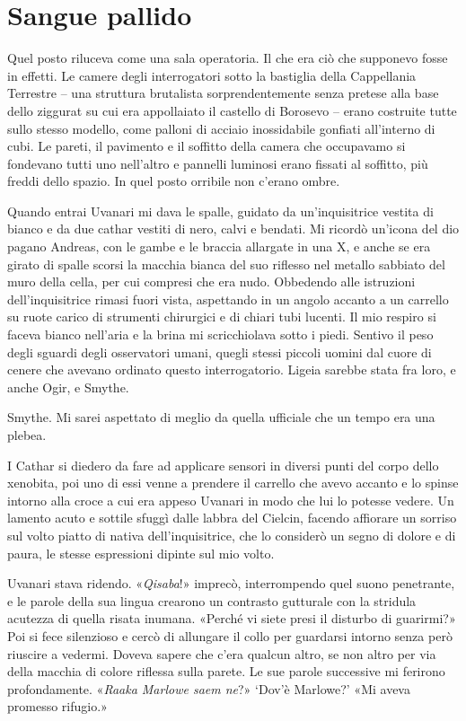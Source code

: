 \chapter{Sangue pallido}

Quel posto riluceva come una sala operatoria. Il che era ciò che
supponevo fosse in effetti. Le camere degli interrogatori sotto la
bastiglia della Cappellania Terrestre -- una struttura brutalista
sorprendentemente senza pretese alla base dello ziggurat su cui era
appollaiato il castello di Borosevo -- erano costruite tutte sullo
stesso modello, come palloni di acciaio inossidabile gonfiati
all'interno di cubi. Le pareti, il pavimento e il soffitto della camera
che occupavamo si fondevano tutti uno nell'altro e pannelli luminosi
erano fissati al soffitto, più freddi dello spazio. In quel posto
orribile non c'erano ombre.

Quando entrai Uvanari mi dava le spalle, guidato da un'inquisitrice
vestita di bianco e da due cathar vestiti di nero, calvi e bendati. Mi
ricordò un'icona del dio pagano Andreas, con le gambe e le braccia
allargate in una X, e anche se era girato di spalle scorsi la macchia
bianca del suo riflesso nel metallo sabbiato del muro della cella, per
cui compresi che era nudo. Obbedendo alle istruzioni dell'inquisitrice
rimasi fuori vista, aspettando in un angolo accanto a un carrello su
ruote carico di strumenti chirurgici e di chiari tubi lucenti. Il mio
respiro si faceva bianco nell'aria e la brina mi scricchiolava sotto i
piedi. Sentivo il peso degli sguardi degli osservatori umani, quegli
stessi piccoli uomini dal cuore di cenere che avevano ordinato questo
interrogatorio. Ligeia sarebbe stata fra loro, e anche Ogir, e Smythe.

Smythe. Mi sarei aspettato di meglio da quella ufficiale che un tempo
era una plebea.

I Cathar si diedero da fare ad applicare sensori in diversi punti del
corpo dello xenobita, poi uno di essi venne a prendere il carrello che
avevo accanto e lo spinse intorno alla croce a cui era appeso Uvanari in
modo che lui lo potesse vedere. Un lamento acuto e sottile sfuggì dalle
labbra del Cielcin, facendo affiorare un sorriso sul volto piatto di
nativa dell'inquisitrice, che lo considerò un segno di dolore e di
paura, le stesse espressioni dipinte sul mio volto.

Uvanari stava ridendo. «\emph{Qisaba}!» imprecò, interrompendo quel
suono penetrante, e le parole della sua lingua crearono un contrasto
gutturale con la stridula acutezza di quella risata inumana. «Perché vi
siete presi il disturbo di guarirmi?» Poi si fece silenzioso e cercò di
allungare il collo per guardarsi intorno senza però riuscire a vedermi.
Doveva sapere che c'era qualcun altro, se non altro per via della
macchia di colore riflessa sulla parete. Le sue parole successive mi
ferirono profondamente. «\emph{Raaka Marlowe saem ne}?» `Dov'è Marlowe?'
«Mi aveva promesso rifugio.»

